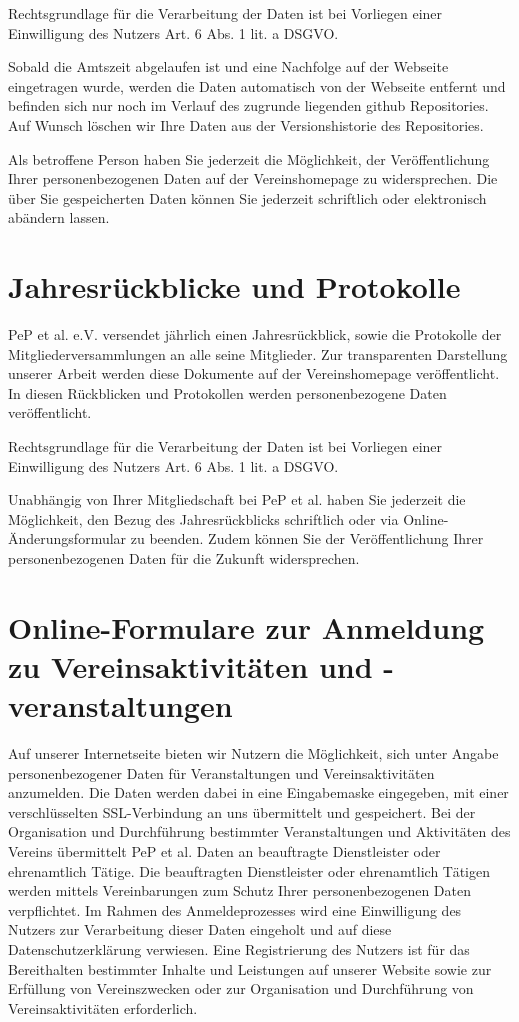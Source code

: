 \documentclass[
  fontsize=12pt,
  paper=a4,
  DIV14,
  parskip,
]{scrartcl}
\begin{document}
Rechtsgrundlage für die Verarbeitung der Daten ist bei Vorliegen einer
Einwilligung des Nutzers Art. 6 Abs. 1 lit. a DSGVO.

Sobald die Amtszeit abgelaufen ist und eine Nachfolge auf der Webseite
eingetragen wurde, werden die Daten automatisch von der Webseite entfernt und
befinden sich nur noch im Verlauf des zugrunde liegenden github Repositories.
Auf Wunsch löschen wir Ihre Daten aus der Versionshistorie des Repositories.

Als betroffene Person haben Sie jederzeit die Möglichkeit, der
Veröffentlichung Ihrer personenbezogenen Daten auf der Vereinshomepage zu
widersprechen. Die über Sie gespeicherten Daten können Sie jederzeit
schriftlich oder elektronisch abändern lassen.

\section{Jahresrückblicke und Protokolle}

PeP et al. e.V. versendet jährlich einen Jahresrückblick, sowie die
Protokolle der Mitgliederversammlungen an alle seine Mitglieder. Zur
transparenten Darstellung unserer Arbeit werden diese Dokumente auf der
Vereinshomepage veröffentlicht.
In diesen Rückblicken und Protokollen werden personenbezogene Daten
veröffentlicht.

Rechtsgrundlage für die Verarbeitung der Daten ist bei Vorliegen einer
Einwilligung des Nutzers Art. 6 Abs. 1 lit. a DSGVO.

Unabhängig von Ihrer Mitgliedschaft bei PeP et al. haben Sie jederzeit die
Möglichkeit, den Bezug des Jahresrückblicks schriftlich oder via
Online-Änderungsformular zu beenden.
Zudem können Sie der Veröffentlichung Ihrer personenbezogenen Daten für die
Zukunft widersprechen.

\section{Online-Formulare zur Anmeldung zu Vereinsaktivitäten und -veranstaltungen}

Auf unserer Internetseite bieten wir Nutzern die Möglichkeit, sich unter
Angabe personenbezogener Daten für Veranstaltungen und Vereinsaktivitäten
anzumelden.
Die Daten werden dabei in eine Eingabemaske eingegeben, mit einer
verschlüsselten SSL-Verbindung an uns übermittelt und gespeichert.
Bei der Organisation und Durchführung bestimmter Veranstaltungen und
Aktivitäten des Vereins übermittelt PeP et al. Daten an beauftragte
Dienstleister oder ehrenamtlich Tätige.
Die beauftragten Dienstleister oder ehrenamtlich Tätigen werden mittels
Vereinbarungen zum Schutz Ihrer personenbezogenen Daten verpflichtet.
Im Rahmen des Anmeldeprozesses wird eine Einwilligung des Nutzers zur
Verarbeitung dieser Daten eingeholt und auf diese Datenschutzerklärung
verwiesen.
Eine Registrierung des Nutzers ist für das Bereithalten bestimmter Inhalte
und Leistungen auf unserer Website sowie zur Erfüllung von Vereinszwecken
oder zur Organisation und Durchführung von Vereinsaktivitäten erforderlich.
\end{document}
